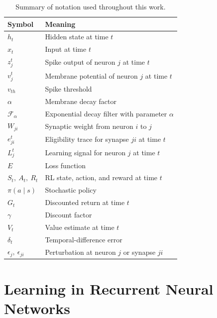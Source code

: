 \begin{table}[h]
\centering
\begin{tabular}{ll}
\toprule
\textbf{Symbol} & \textbf{Meaning} \\
\midrule
$h_t$                        & Hidden state at time $t$ \\
$x_t$                        & Input at time $t$ \\
$z^t_j$                      & Spike output of neuron $j$ at time $t$ \\
$v^t_j$                      & Membrane potential of neuron $j$ at time $t$ \\
$v_{th}$                     & Spike threshold \\
$\alpha$                     & Membrane decay factor \\
$\mathcal{F}_\alpha$         & Exponential decay filter with parameter $\alpha$ \\
$W_{ji}$                     & Synaptic weight from neuron $i$ to $j$ \\
$e^t_{ji}$                   & Eligibility trace for synapse $ji$ at time $t$ \\
$L^t_j$                      & Learning signal for neuron $j$ at time $t$ \\
$E$                          & Loss function \\
$S_t,\ A_t,\ R_t$            & RL state, action, and reward at time $t$ \\
$\pi(a \mid s)$              & Stochastic policy \\
$G_t$                        & Discounted return at time $t$ \\
$\gamma$                     & Discount factor \\
$V_t$                        & Value estimate at time $t$ \\
$\delta_t$                   & Temporal-difference error \\
$\epsilon_j,\ \epsilon_{ji}$ & Perturbation at neuron $j$ or synapse $ji$ \\
\bottomrule
\end{tabular}
\caption{Summary of notation used throughout this work.}
\label{tab:notation}
\end{table}

\section{Learning in Recurrent Neural Networks}
\label{sec:rnn-learning}

